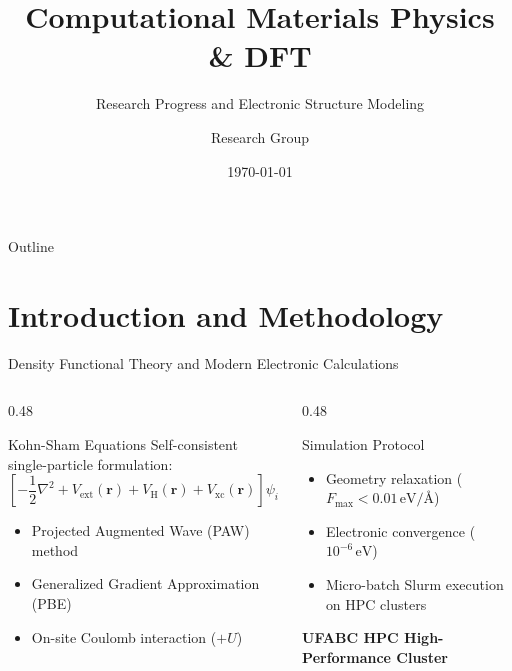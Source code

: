 \documentclass[aspectratio=169, sectionpages, codemintedoverleaf, bibref]{beamer}
\title{Computational Materials Physics \& DFT}
\subtitle{Research Progress and Electronic Structure Modeling}
\author{Research Group}
\institute{Universidade Federal do ABC (UFABC)}
\date{\today}
\begin{document}
\titlepage

\begin{frame}{Outline}
  \tableofcontents
\end{frame}

\section{Introduction and Methodology}

\begin{frame}{Density Functional Theory and Modern Electronic Calculations}
  \begin{columns}[T]
    \begin{column}{0.48\textwidth}
      \begin{block}{Kohn-Sham Equations}
        Self-consistent single-particle formulation:
        \[
          \left[ -\frac{1}{2}\nabla^2 + V_{\text{ext}}(\mathbf{r}) + V_{\text{H}}(\mathbf{r}) + V_{\text{xc}}(\mathbf{r}) \right] \psi_i(\mathbf{r}) = \varepsilon_i \psi_i(\mathbf{r})
        \]
      \end{block}
      \begin{itemize}
        \item Projected Augmented Wave (PAW) method
        \item Generalized Gradient Approximation (PBE)
        \item On-site Coulomb interaction ($+U$)
      \end{itemize}
    \end{column}

    \begin{column}{0.48\textwidth}
      \begin{exampleblock}{Simulation Protocol}
        \begin{itemize}
          \item Geometry relaxation ($F_{\text{max}} < 0.01\,\text{eV/\AA}$)
          \item Electronic convergence ($10^{-6}\,\text{eV}$)
          \item Micro-batch Slurm execution on HPC clusters
        \end{itemize}
      \end{exampleblock}
      \vspace{1em}
      \centering
      {\small \textcolor{nordEight}{\textbf{UFABC HPC High-Performance Cluster}}}
    \end{column}
  \end{columns}
\end{frame}
\end{document}
